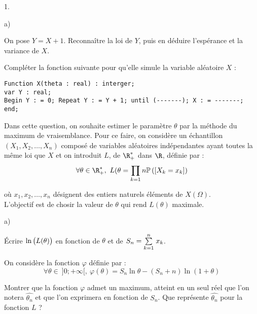 \documentclass[11pt]{article}%
\begin{document}
\begin{noliste}{1.}
 \setlength{\itemsep}{4mm}

\item \begin{noliste}{a)}
 \setlength{\itemsep}{2mm}

\item On pose $Y = X + 1$. Reconnaître la loi de $Y$, puis en déduire
l'espérance et la variance de $X$.

\item Compléter la fonction \Scilab{} suivante pour qu'elle simule la
variable aléatoire $X$ : 
\begin{verbatim}
Function X(theta : real) : interger;
var Y : real;
Begin Y : = 0; Repeat Y : = Y + 1; until (-------); X : = -------; end;
\end{verbatim}

\end{noliste}

\item Dans cette question, on souhaite estimer le paramètre $\theta$
par la méthode du maximum de vraisemblance. Pour ce faire, on considère
un échantillon $(X_{1}, X_{2}, \dots, X_{n})$ composé de variables
aléatoires indépendantes ayant toutes la même loi que $X$ et on
introduit $L$, de $\R_+^{\ast}$ dans $\R$, définie par :
\[
 \forall \theta \in \R_+^{\ast}, \ L( \theta = \prod\limits_{k = 1}{n}
\Prob\left(\Ev{ X_{k} = x_{k} }\right) 
\]

où $x_{1}, x_{2}, \dots, x_{n}$ désignent des entiers naturels éléments
de $X ( \Omega ) $. \\

L'objectif est de chosir la valeur de $\theta$ qui rend $ L (\theta)$
maximale.

\begin{noliste}{a)}
 \setlength{\itemsep}{2mm}

\item Écrire $\ln \left( \rule{0cm}{0.3cm} L( \theta) \right) $ en
fonction de $\theta$ et de $S_{n} = {\textstyle\sum\limits_{k = 1}^{n}}\hspace{.1cm} x_{k}$.

\item On considère la fonction $\varphi$ définie par :
\[
 \forall \theta \in \ ] 0 ; + \infty [, \ \varphi ( \theta ) = S_{n}
\ln \theta - (S_{n} + n) \ln ( 1 + \theta ) 
\]

Montrer que la fonction $\varphi$ admet un maximum, atteint en un seul
réel que l'on notera $\widehat{\theta_{n}}$ et que l'on exprimera en
fonction de $S_{n}$. Que représente $\widehat{\theta_{n}}$ pour la
fonction $L$ ?


\end{noliste}
\end{noliste}
\end{document}
